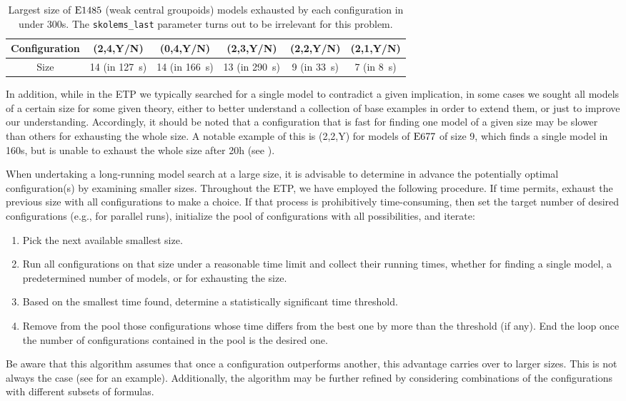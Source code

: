\begin{table}
\centering
\caption{Largest size of $\mathrm{E}1485$ (weak central groupoids) models exhausted by each configuration in under 300s. The \texttt{skolems\_last} parameter turns out to be irrelevant for this problem.}
\label{table:weakcentralgroupoids}
\begin{tabular}{cccccc}
  \toprule
  Configuration &(2,4,Y/N) & (0,4,Y/N) & (2,3,Y/N) & (2,2,Y/N) & (2,1,Y/N) \\\midrule
  Size &14 (in \SI{127}{s}) & 14 (in \SI{166}{s}) & 13 (in \SI{290}{s}) & 9 (in \SI{33}{s}) & 7 (in \SI{8}{s}) \\
  \bottomrule
\end{tabular}
\end{table}

In addition, while in the ETP we typically searched for a single model to contradict a given implication, in some cases we sought all models of a certain size for some given theory, either to better understand a collection of base examples in order to extend them, or just to improve our understanding. Accordingly, it should be noted that a configuration that is fast for finding one model of a given size may be slower than others for exhausting the whole size. A notable example of this is (2,2,Y) for models of $\mathrm{E}677$ of size 9, which finds a single model in 160s, but is unable to exhaust the whole size after 20h (see ).

When undertaking a long-running model search at a large size, it is advisable to determine in advance the potentially optimal configuration(s) by examining smaller sizes. Throughout the ETP, we have employed the following procedure. If time permits, exhaust the previous size with all configurations to make a choice. If that process is prohibitively time-consuming, then set the target number of desired configurations (e.g., for parallel runs), initialize the pool of configurations with all possibilities, and iterate:
\begin{enumerate}
\item Pick the next available smallest size.
\item Run all configurations on that size under a reasonable time limit and collect their running times, whether for finding a single model, a predetermined number of models, or for exhausting the size.
\item Based on the smallest time found, determine a statistically significant time threshold.
\item Remove from the pool those configurations whose time differs from the best one by more than the threshold (if any). End the loop once the number of configurations contained in the pool is the desired one.
\end{enumerate}
Be aware that this algorithm assumes that once a configuration outperforms another, this advantage carries over to larger sizes. This is not always the case (see  for an example). Additionally, the algorithm may be further refined by considering combinations of the configurations with different subsets of formulas.

